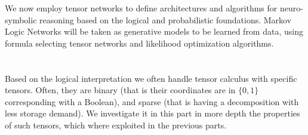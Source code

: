 \documentclass[aps,onecolumn,nofootinbib,pra]{article}
\begin{document}
    We now employ tensor networks to define architectures and algorithms for neuro-symbolic reasoning based on the logical and probabilistic foundations.
    Markov Logic Networks will be taken as generative models to be learned from data, using formula selecting tensor networks and likelihood optimization algorithms.

    

    
    

    

    


    \part{\partthreetext}\label{par:three}

    Based on the logical interpretation we often handle tensor calculus with specific tensors.
    Often, they are binary (that is their coordinates are in $\{0,1\}$ corresponding with a Boolean), and sparse (that is having a decomposition with less storage demand).
    We investigate it in this part in more depth the properties of such tensors, which where exploited in the previous parts.

    
    

    

    

    




    \appendix
    

    
    
\end{document}
